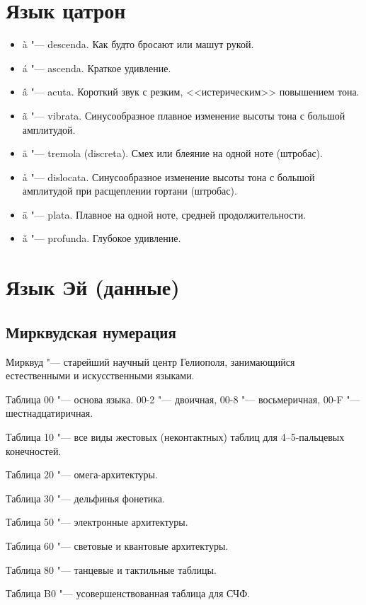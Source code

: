 \documentclass[a4paper,10pt,fleqn]{book}
\begin{document}
\section{Язык цатрон}

\begin{itemize}
\item \`a "--- descenda. Как будто бросают или машут рукой.
\item \'a "--- ascenda. Краткое удивление.
\item \^a "--- acuta. Короткий звук с резким, <<истерическим>> повышением тона.
\item \~a "--- vibrata. Синусообразное плавное изменение высоты тона с большой амплитудой.
\item \"a "--- tremola (discreta). Смех или блеяние на одной ноте (штробас).
\item \r{a} "--- dislocata. Синусообразное изменение высоты тона с большой амплитудой при расщеплении гортани (штробас).
\item \=a "--- plata. Плавное на одной ноте, средней продолжительности.
\item \v{a} "--- profunda. Глубокое удивление.
\end{itemize}

\section{Язык Эй (данные)}

\subsection{Мирквудская нумерация}

Мирквуд "--- старейший научный центр Гелиополя, занимающийся естественными и искусственными языками.

Таблица 00 "--- основа языка. 00-2 "--- двоичная, 00-8 "--- восьмеричная, 00-F "--- шестнадцатиричная.

Таблица 10 "--- все виды жестовых (неконтактных) таблиц для 4--5-пальцевых конечностей.

Таблица 20 "--- омега-архитектуры.

Таблица 30 "--- дельфинья фонетика.

Таблица 50 "--- электронные архитектуры.

Таблица 60 "--- световые и квантовые архитектуры.

Таблица 80 "--- танцевые и тактильные таблицы.

Таблица B0 "--- усовершенствованная таблица для СЧФ.
\end{document}
